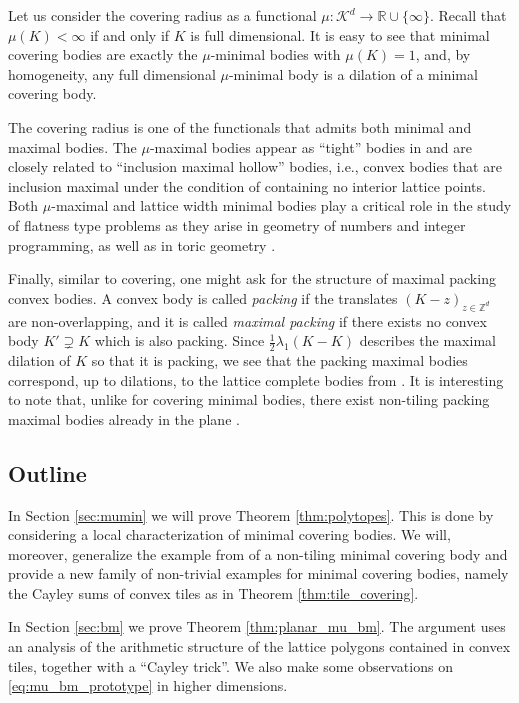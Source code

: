 \documentclass[11pt, a4paper]{amsart}
\newcommand{\RR}{\mathbb{R}}
\newcommand{\ZZ}{\mathbb{Z}}
\newcommand{\K}{\mathcal{K}}
\numberwithin{equation}{section}
\theoremstyle{plain}
\begin{document}
Let us consider the covering radius as a functional
\(
\mu \colon \K^d\to\RR\cup\{\infty\}.
\)
Recall that $\mu(K) < \infty$ if and only if $K$ is full dimensional. It is easy to see that minimal covering bodies are exactly the $\mu$-minimal bodies with $\mu(K) = 1$, and, by homogeneity, any full dimensional $\mu$-minimal body is a dilation of a minimal covering body.

The covering radius is one of the functionals that admits both minimal and maximal bodies. The $\mu$-maximal bodies appear as ``tight'' bodies in \cite{codenottischymurasantos} and are closely related to ``inclusion maximal hollow'' bodies, i.e., convex bodies that are inclusion maximal under the condition of containing no interior lattice points. Both $\mu$-maximal and lattice width minimal bodies play a critical role in the study of flatness type problems as they arise in geometry of numbers and integer programming, as well as in toric geometry \cite{averkovcodenottifreyerhuang, codenottifreyer, coolslemmens}.

Finally, similar to covering, one might ask for the structure of maximal packing convex bodies. A convex body is called \emph{packing} if the translates $(K-z)_{z\in\ZZ^d}$ are non-overlapping, and it is called \emph{maximal packing} if there exists no convex body $K' \supsetneq K$ which is also packing. Since $\tfrac 12\lambda_1(K-K)$ describes the maximal dilation of $K$ so that it is packing, we see that the packing maximal bodies correspond, up to dilations, to the lattice complete bodies from \cite{codenottifreyer}. It is interesting to note that, unlike for covering minimal bodies, there exist non-tiling packing maximal bodies already in the plane \cite[Proposition 3.12]{codenottifreyer}. 

\subsection*{Outline} In Section \ref{sec:mumin} we will prove Theorem \ref{thm:polytopes}. This is done by considering a local characterization of minimal covering bodies. We will, moreover, generalize the example from \cite{xuezong} of a non-tiling minimal covering body and provide a new family of non-trivial examples for minimal covering bodies, namely the Cayley sums of convex tiles as in Theorem \ref{thm:tile_covering}.

In Section \ref{sec:bm} we prove Theorem \ref{thm:planar_mu_bm}. The argument uses an analysis of the arithmetic structure of the lattice polygons contained in convex tiles, together with a ``Cayley trick''. We also make some observations on \eqref{eq:mu_bm_prototype} in higher dimensions.
\end{document}

